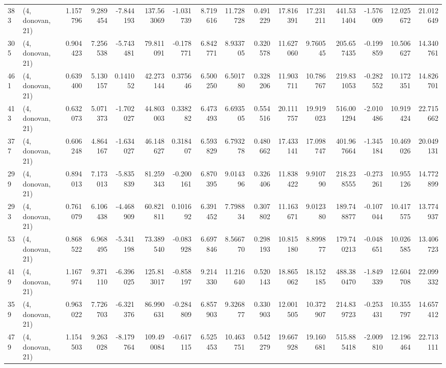 \begin{tabular}{llrrrrrrrrrrrrrr}
383 &  (4, donovan, 21) &   1.157796 &   9.289454 &  -7.844193 &   137.563069 &  -1.031739 &   8.719616 &  11.728728 &  0.491229 &  17.816391 &  17.231211 &   441.531404 & -1.576009 &  12.025672 &  21.012649 \\
305 &  (4, donovan, 21) &   0.904423 &   7.256538 &  -5.743481 &    79.811091 &  -0.178771 &   6.842771 &   8.933705 &  0.320578 &  11.627060 &   9.760545 &   205.657435 & -0.199859 &  10.506627 &  14.340761 \\
461 &  (4, donovan, 21) &   0.639400 &   5.130157 &   0.141052 &    42.273144 &   0.375646 &   6.500250 &   6.501780 &  0.328206 &  11.903711 &  10.786767 &   219.831053 & -0.282552 &  10.172351 &  14.826701 \\
413 &  (4, donovan, 21) &   0.632073 &   5.071373 &  -1.702027 &    44.803003 &   0.338282 &   6.473493 &   6.693505 &  0.554516 &  20.111757 &  19.919023 &   516.001294 & -2.010486 &  10.919424 &  22.715662 \\
377 &  (4, donovan, 21) &   0.606248 &   4.864167 &  -1.634027 &    46.148627 &   0.318407 &   6.593829 &   6.793278 &  0.480662 &  17.433141 &  17.098747 &   401.967664 & -1.345184 &  10.469026 &  20.049131 \\
299 &  (4, donovan, 21) &   0.894013 &   7.173013 &  -5.835839 &    81.259343 &  -0.200161 &   6.870395 &   9.014396 &  0.326406 &  11.838422 &   9.910790 &   218.238555 & -0.273261 &  10.955126 &  14.772899 \\
293 &  (4, donovan, 21) &   0.761079 &   6.106438 &  -4.468909 &    60.821811 &   0.101692 &   6.391452 &   7.798834 &  0.307802 &  11.163671 &   9.012380 &   189.748877 & -0.107044 &  10.417575 &  13.774937 \\
53  &  (4, donovan, 21) &   0.868522 &   6.968495 &  -5.341198 &    73.389540 &  -0.083928 &   6.697846 &   8.566770 &  0.298193 &  10.815180 &   8.899877 &   179.740213 & -0.048651 &  10.026585 &  13.406723 \\
419 &  (4, donovan, 21) &   1.167974 &   9.371110 &  -6.396025 &   125.813017 &  -0.858197 &   9.214330 &  11.216640 &  0.520143 &  18.865062 &  18.152185 &   488.380470 & -1.849339 &  12.604708 &  22.099332 \\
359 &  (4, donovan, 21) &   0.963022 &   7.726703 &  -6.321376 &    86.990631 &  -0.284809 &   6.857903 &   9.326877 &  0.330903 &  12.001505 &  10.372907 &   214.839723 & -0.253431 &  10.355797 &  14.657412 \\
479 &  (4, donovan, 21) &   1.154503 &   9.263028 &  -8.179764 &   109.490084 &  -0.617115 &   6.525453 &  10.463751 &  0.542279 &  19.667928 &  19.160681 &   515.885418 & -2.009810 &  12.196464 &  22.713111 \\

\end{tabular}
